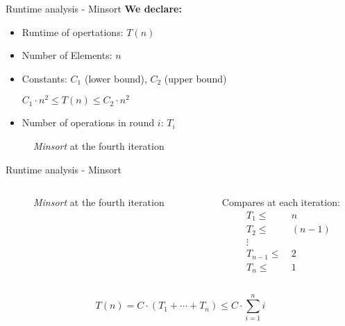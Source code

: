 
\begin{frame}{Runtime analysis - Minsort}
  \textbf{We declare:}
  \begin{itemize}
    \item Runtime of opertations: $T(n)$
    \item Number of Elements: $n$
    \item Constants: $C_1$ ({\color{MainBLight}lower bound}),
      $C_2$ ({\color{MainBLight}upper bound})
    \begin{center}
      $C_{1} \cdot n^2
      \leq T(n)
      \leq C_{2} \cdot n^2$
    \end{center}
    \item Number of operations in round $i$: $T_i$
  \end{itemize}
  \begin{figure}[!h]
    \begin{adjustbox}{width=0.5\linewidth}
    \end{adjustbox}%
    \caption{\textit{Minsort} at the fourth iteration}%
    \label{fig:minsort_def}%
  \end{figure}
\end{frame}


\begin{frame}{Runtime analysis - Minsort}
  \begin{columns}
    \begin{column}{0.55\textwidth}
      \begin{figure}[!h]%
        \begin{adjustbox}{width=\linewidth}%
        \end{adjustbox}%
        \caption{\textit{Minsort} at the fourth iteration}%
        \label{fig:minsort_brace}%
      \end{figure}
    \end{column}
    \begin{column}{0.40\textwidth}
      Compares at each iteration:
      \begin{align*}
        T_1  \leq &~ n\\
        T_2  \leq &~ (n-1)\\
        {}  \vdots~ &~ {} \\
        T_{n-1}  \leq &~ 2\\
        T_n  \leq &~ 1
      \end{align*}
    \end{column}
  \end{columns}
  \[
    T(n)
      = C \cdot \left(T_1 + \cdots + T_n\right)
      \leq C \cdot \sum \limits^n_{i=1} i
  \]
\end{frame}

